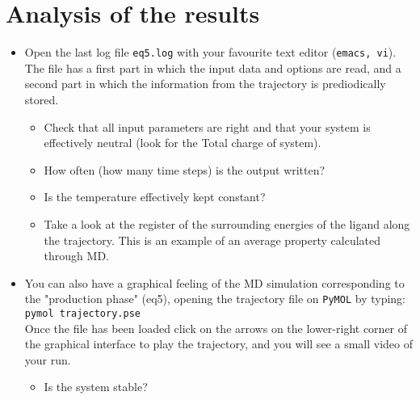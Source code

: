 \documentclass[a4paper,12pt]{article}
\newcommand{\pymol}{\texttt{PyMOL}}
\begin{document}
\section {Analysis of the results}
\begin{itemize}

\item Open the  last log file {\texttt {eq5.log}}  with your favourite
text editor (\texttt{emacs,  vi}). The file has a first  part in which
the input data  and options are read,  and a second part  in which the
information from the trajectory is prediodically stored.

\begin{itemize}

\item Check that  all input parameters are right and  that your system
is effectively neutral (look for the Total charge of system).
\item How often (how many time steps) is the output written?
\item Is the temperature effectively kept constant?
\item Take a  look at the register of the  surrounding energies of the
ligand along the trajectory. This is an example of an average property
calculated through MD.

\end {itemize}
\item  You can  also have  a graphical  feeling of  the MD  simulation
corresponding to the "production  phase" (eq5), opening the trajectory
file on {\pymol} by typing:\\
\texttt{pymol trajectory.pse} \\
Once the file  has been loaded click on the  arrows on the lower-right
corner of the graphical interface to play the trajectory, and you will
see a small video of your run.
\begin {itemize}
\item Is the system stable?
\end {itemize}
\end {itemize}
\end{document}
